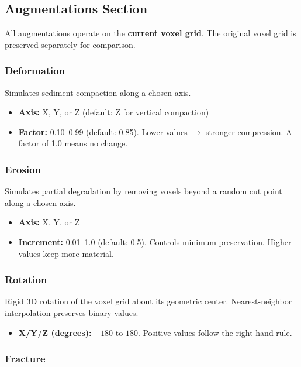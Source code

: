 \documentclass[12pt,a4paper]{article}
\begin{document}
\subsection{Augmentations Section}

All augmentations operate on the \textbf{current voxel grid}. The original voxel grid is preserved separately for comparison.

\subsubsection{Deformation}

Simulates sediment compaction along a chosen axis.

\begin{itemize}
  \item \textbf{Axis:} X, Y, or Z (default: Z for vertical compaction)
  \item \textbf{Factor:} 0.10--0.99 (default: 0.85). Lower values $\rightarrow$ stronger compression. A factor of 1.0 means no change.
\end{itemize}

\subsubsection{Erosion}

Simulates partial degradation by removing voxels beyond a random cut point along a chosen axis.

\begin{itemize}
  \item \textbf{Axis:} X, Y, or Z
  \item \textbf{Increment:} 0.01--1.0 (default: 0.5). Controls minimum preservation. Higher values keep more material.
\end{itemize}

\subsubsection{Rotation}

Rigid 3D rotation of the voxel grid about its geometric center. Nearest-neighbor interpolation preserves binary values.

\begin{itemize}
  \item \textbf{X/Y/Z (degrees):} $-180$ to $180$. Positive values follow the right-hand rule.
\end{itemize}

\subsubsection{Fracture}
\end{document}
